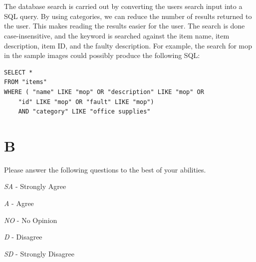 \documentclass[12pt]{report}
\begin{document}
\chapter*{}

The database search is carried out by converting the users search input into a SQL query.  By using categories, we can reduce the number of results returned to the user.  This makes reading the results easier for the user.  The search is done case-insensitive, and the keyword is searched against the item name, item description, item ID, and the faulty description.  For example, the search for mop in the sample images could possibly produce the following SQL:

\lstset{language=SQL}
\begin{lstlisting}
SELECT *
FROM "items"
WHERE ( "name" LIKE "mop" OR "description" LIKE "mop" OR 
    "id" LIKE "mop" OR "fault" LIKE "mop") 
    AND "category" LIKE "office supplies"
\end{lstlisting}

\chapter*{B}

Please answer the following questions to the best of your abilities.
\begin{description}
\item{\emph{SA}} - Strongly Agree
\item{\emph{A}} - Agree
\item{\emph{NO}} - No Opinion
\item{\emph{D}} - Disagree
\item{\emph{SD}} - Strongly Disagree
\end{description}
\end{document}
